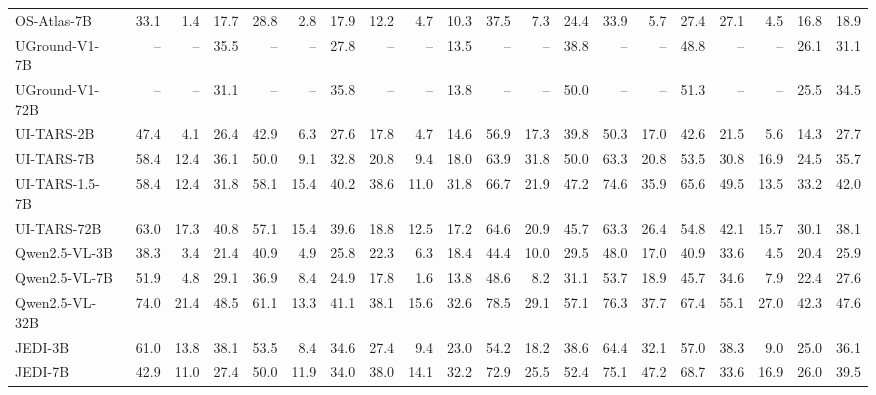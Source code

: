 \begin{table}[htbp]
{\begin{tabular}{@{}l rrr rrr rrr rrr rrr rrr r @{}}
       OS-Atlas-7B~\citeyearpar{wu2024osatlas}  & 33.1 & 1.4 & 17.7 & 28.8 & 2.8 & 17.9 & 12.2 & 4.7 & 10.3 & 37.5 & 7.3 & 24.4 & 33.9 & 5.7 & 27.4 & 27.1 & 4.5 & 16.8 & 18.9 \\
       UGround-V1-7B~\citeyearpar{gou2024navigating} & -- & -- & 35.5 & -- & -- & 27.8 & -- & -- & 13.5 & -- & -- & 38.8 & -- & -- & 48.8 & -- & -- & 26.1 & 31.1 \\
       UGround-V1-72B~\citeyearpar{gou2024navigating} & -- & -- & 31.1 & -- & -- & 35.8 & -- & -- & 13.8 & -- & -- & 50.0 & -- & -- & 51.3 & -- & -- & 25.5 & 34.5 \\
       UI-TARS-2B~\citeyearpar{qin2025uitars} & 47.4 & 4.1 & 26.4 & 42.9 & 6.3 & 27.6 & 17.8 & 4.7 & 14.6 & 56.9 & 17.3 & 39.8 & 50.3 & 17.0 & 42.6 & 21.5 & 5.6 & 14.3 & 27.7 \\
       UI-TARS-7B~\citeyearpar{qin2025uitars} & 58.4 & 12.4& 36.1 & 50.0 & 9.1 & 32.8 & 20.8 & 9.4 & 18.0 & 63.9 & 31.8 & 50.0 & 63.3 & 20.8 & 53.5 & 30.8 & 16.9 & 24.5 & 35.7 \\
       UI-TARS-1.5-7B~\citeyearpar{qin2025uitars} & 58.4 & 12.4 & 31.8 & 58.1 & 15.4 & 40.2 & 38.6 & 11.0 & 31.8 & 66.7 & 21.9 & 47.2 & 74.6 & 35.9 & 65.6 & 49.5 & 13.5 & 33.2 & 42.0 \\
       UI-TARS-72B~\citeyearpar{qin2025uitars} & 63.0 & 17.3 & 40.8 & 57.1 & 15.4 & 39.6 & 18.8 & 12.5 & 17.2 & 64.6 & 20.9 & 45.7 & 63.3 & 26.4 & 54.8 & 42.1 & 15.7 & 30.1 & 38.1 \\
       Qwen2.5-VL-3B~\citeyearpar{bai2025qwen25vl} & 38.3 & 3.4 & 21.4 & 40.9 & 4.9 & 25.8 & 22.3 & 6.3 & 18.4 & 44.4 & 10.0 & 29.5 & 48.0 & 17.0 & 40.9 & 33.6 & 4.5 & 20.4 & 25.9 \\
       Qwen2.5-VL-7B~\citeyearpar{bai2025qwen25vl} & 51.9 & 4.8 & 29.1 & 36.9 & 8.4 & 24.9 & 17.8 & 1.6 & 13.8 & 48.6 & 8.2 & 31.1 & 53.7 & 18.9 & 45.7 & 34.6 & 7.9 & 22.4 & 27.6 \\
       Qwen2.5-VL-32B~\citeyearpar{bai2025qwen25vl} & 74.0 & 21.4 & 48.5 & 61.1 & 13.3 & 41.1 & 38.1 & 15.6 & 32.6 & 78.5 & 29.1 & 57.1 & 76.3 & 37.7 & 67.4 & 55.1 & 27.0 & 42.3 & 47.6 \\
       JEDI-3B~\citeyearpar{xie2025scalingcomputerusegroundinguser} & 61.0 & 13.8 & 38.1 & 53.5 & 8.4 & 34.6 & 27.4 & 9.4 & 23.0 & 54.2 & 18.2 & 38.6 & 64.4 & 32.1 & 57.0 & 38.3 & 9.0 & 25.0 & 36.1 \\
       JEDI-7B~\citeyearpar{xie2025scalingcomputerusegroundinguser} & 42.9 & 11.0 & 27.4 & 50.0 & 11.9 & 34.0 & 38.0 & 14.1 & 32.2 & 72.9 & 25.5 & 52.4 & 75.1 & 47.2 & 68.7 & 33.6 & 16.9 & 26.0 & 39.5 \\

\end{tabular}}
\end{table}
